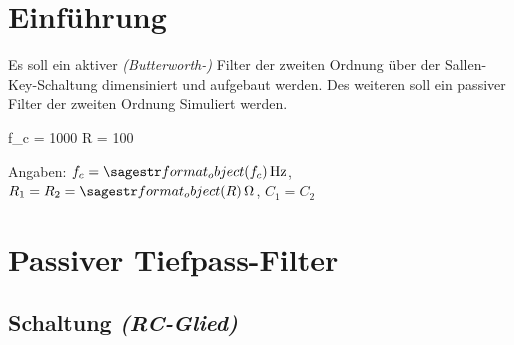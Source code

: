 \documentclass[a4paper]{hitec}
\author{Rene Hampölz, Gruppe 6}
\date{19. September 2022}
\begin{document}
\maketitletoc
\clearpage

\section{Einführung}

Es soll ein aktiver \textit{(Butterworth-)} Filter der zweiten Ordnung über der Sallen-Key-Schaltung dimensiniert und aufgebaut werden. Des weiteren soll ein passiver Filter der zweiten Ordnung Simuliert werden.

\begin{sagesilent}
    f_c = 1000
    R = 100
\end{sagesilent}

Angaben: $f_c = \SIvar{f_c}{\hertz}$, $R_1 = R_2 = \SIvar{R}{\ohm}$, $C_1 = C_2$

\section{Passiver Tiefpass-Filter}

\subsection{Schaltung \textit{(RC-Glied)}}
\end{document}
